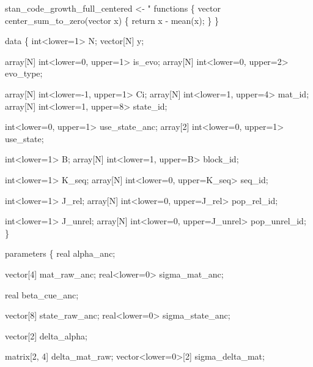 \documentclass[
]{article}
\newenvironment{Shaded}{\begin{snugshade}}{\end{snugshade}}
\newcommand{\NormalTok}[1]{#1}
\newcommand{\OtherTok}[1]{\textcolor[rgb]{0.56,0.35,0.01}{#1}}
\newcommand{\StringTok}[1]{\textcolor[rgb]{0.31,0.60,0.02}{#1}}
\begin{document}
\begin{Shaded}
\begin{Highlighting}[]
\NormalTok{stan\_code\_growth\_full\_centered }\OtherTok{\textless{}{-}} \StringTok{"}
\StringTok{functions \{}
\StringTok{  vector center\_sum\_to\_zero(vector x) \{}
\StringTok{    return x {-} mean(x);}
\StringTok{  \}}
\StringTok{\}}

\StringTok{data \{}
\StringTok{  int\textless{}lower=1\textgreater{} N;}
\StringTok{  vector[N] y;}

\StringTok{  array[N] int\textless{}lower=0, upper=1\textgreater{} is\_evo;}
\StringTok{  array[N] int\textless{}lower=0, upper=2\textgreater{} evo\_type;}

\StringTok{  array[N] int\textless{}lower={-}1, upper=1\textgreater{} Ci;}
\StringTok{  array[N] int\textless{}lower=1, upper=4\textgreater{} mat\_id;}
\StringTok{  array[N] int\textless{}lower=1, upper=8\textgreater{} state\_id;}

\StringTok{  int\textless{}lower=0, upper=1\textgreater{} use\_state\_anc;}
\StringTok{  array[2] int\textless{}lower=0, upper=1\textgreater{} use\_state;}

\StringTok{  int\textless{}lower=1\textgreater{} B;}
\StringTok{  array[N] int\textless{}lower=1, upper=B\textgreater{} block\_id;}

\StringTok{  int\textless{}lower=1\textgreater{} K\_seq;}
\StringTok{  array[N] int\textless{}lower=0, upper=K\_seq\textgreater{} seq\_id;}

\StringTok{  int\textless{}lower=1\textgreater{} J\_rel;}
\StringTok{  array[N] int\textless{}lower=0, upper=J\_rel\textgreater{} pop\_rel\_id;}

\StringTok{  int\textless{}lower=1\textgreater{} J\_unrel;}
\StringTok{  array[N] int\textless{}lower=0, upper=J\_unrel\textgreater{} pop\_unrel\_id;}
\StringTok{\}}

\StringTok{parameters \{}
\StringTok{  real alpha\_anc;}

\StringTok{  vector[4] mat\_raw\_anc;}
\StringTok{  real\textless{}lower=0\textgreater{} sigma\_mat\_anc;}

\StringTok{  real beta\_cue\_anc;}

\StringTok{  vector[8] state\_raw\_anc;}
\StringTok{  real\textless{}lower=0\textgreater{} sigma\_state\_anc;}

\StringTok{  vector[2] delta\_alpha;}

\StringTok{  matrix[2, 4] delta\_mat\_raw;}
\StringTok{  vector\textless{}lower=0\textgreater{}[2] sigma\_delta\_mat;}


\end{Highlighting}
\end{Shaded}
\end{document}

